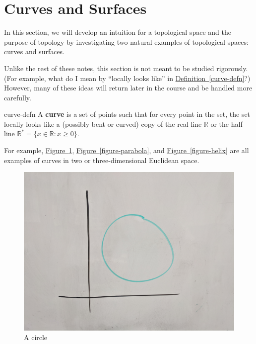 \documentclass[10pt,]{article}
\newcommand{\terminology}[1]{\textbf{#1}}
\begin{document}
\section[{Curves and Surfaces}]{Curves and Surfaces}\label{section-surfaces}
\hypertarget{p-4}{}%
In this section, we will develop an intuition for a topological space and the purpose of topology by investigating two natural examples of topological spaces: curves and surfaces.%
\par
\hypertarget{p-5}{}%
Unlike the rest of these notes, this section is not meant to be studied rigorously. (For example, what do I mean by ``locally looks like'' in \hyperref[curve-defn]{Definition~\ref{curve-defn}}?)  However, many of these ideas will return later in the course and be handled more carefully.%
\begin{definition}{}{curve-defn}%
\hypertarget{p-6}{}%
A \terminology{curve} is a set of points such that for every point in the set, the set locally looks like a (possibly bent or curved) copy of the real line \(\mathbb R\) or the half line \(\mathbb R^*=\{x\in\mathbb R:x\geq 0\}\).%
\end{definition}
\hypertarget{p-7}{}%
For example, \hyperref[circle-fig]{Figure~\ref{circle-fig}}, \hyperref[figure-parabola]{Figure~\ref{figure-parabola}}, and \hyperref[figure-helix]{Figure~\ref{figure-helix}} are all examples of curves in two or three-dimensional Euclidean space.%
\begin{figure}
\centering
\includegraphics[width=1\linewidth]{images/circle.jpg}
\caption{A circle\label{circle-fig}}
\end{figure}
\end{document}
